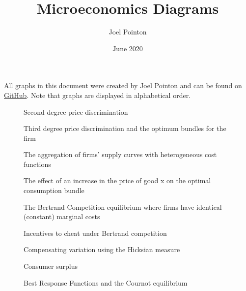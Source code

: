 \documentclass{article}
\title{Microeconomics Diagrams}
\author{Joel Pointon}
\date{June 2020}
\begin{document}
\maketitle
All graphs in this document were created by Joel Pointon and can be found on \href{https://github.com/pointonjoel/TeXonomics}{GitHub}. Note that graphs are displayed in alphabetical order.

\listoffigures

\begin{figure}[H]
    \centering
    
    \caption{Second degree price discrimination}
    \label{fig:1}
\end{figure}
\begin{figure}[H]
    \centering
    
    \caption{Third degree price discrimination and the optimum bundles for the firm}
    \label{fig:2}
\end{figure}
\begin{figure}[H]
    \centering
    
    \caption{The aggregation of firms' supply curves with heterogeneous cost functions}
    \label{fig:3}
\end{figure}
\begin{figure}[H]
    \centering
    
    \caption{The effect of an increase in the price of good x on the optimal consumption bundle}
    \label{fig:4}
\end{figure}
\begin{figure}[H]
    \centering
    
    \caption{The Bertrand Competition equilibrium where firms have identical (constant) marginal  costs}
    \label{fig:5}
\end{figure}
\begin{figure}[H]
    \centering
    
    \caption{Incentives to cheat under Bertrand competition}
    \label{fig:6}
\end{figure}
\begin{figure}[H]
    \centering
    
    \caption{Compensating variation using the Hicksian measure}
    \label{fig:7}
\end{figure}
\begin{figure}[H]
    \centering
    
    \caption{Consumer surplus}
    \label{fig:8}
\end{figure}
\begin{figure}[H]
    \centering
    
    \caption{Best Response Functions and the Cournot equilibrium}
    \label{fig:9}
\end{figure}
\end{document}
